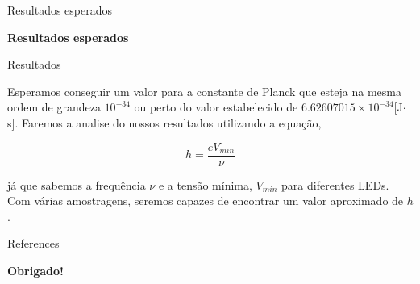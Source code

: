\documentclass[aspectratio=169,12.5pt,xcolor=dvipsnames]{beamer}
\begin{document}
\begin{frame}{Resultados esperados}
    \Huge{\centerline{\textbf{Resultados esperados}}}
\end{frame}


\begin{frame}{Resultados}

Esperamos conseguir um valor para a constante de Planck que esteja na mesma ordem de grandeza $10^{-34}$ ou perto do valor estabelecido de $6.62607015 \times 10^{-34} $[J$\cdot$s]. Faremos a analise do nossos resultados utilizando a equação,


\begin{equation}
    h = \frac{eV_{min}}{\nu} 
\end{equation}

já que sabemos a frequência $\nu$ e a tensão mínima, $V_{min}$ para diferentes LEDs. Com várias amostragens, seremos capazes de encontrar um valor aproximado de $h$.
\end{frame}


\begin{frame}{References}
    \footnotesize
    
    
\end{frame}


\begin{frame}
    \Huge{\centerline{\textbf{Obrigado!}}}
\end{frame}

\end{document}
